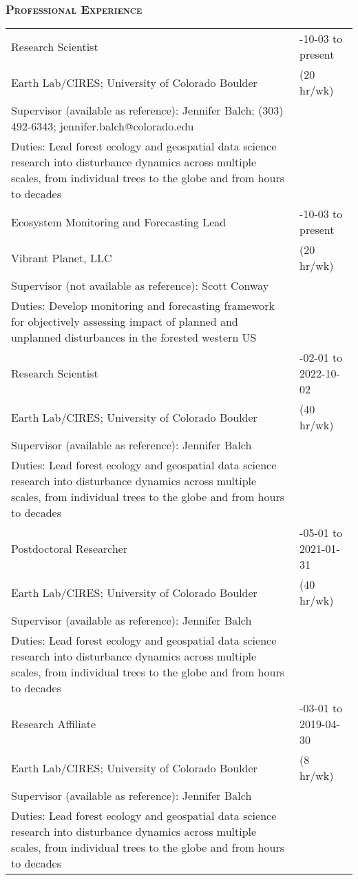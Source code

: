 \documentclass[10pt,english]{article}
\providecommand{\tabularnewline}{\\}
\begin{document}
\subsubsection*{\textsc{Professional Experience}}
\vspace{-0.5ex}

\renewcommand{\arraystretch}{1.2}
\begin{tabularx}{\textwidth}{@{}>{\raggedright}p{4.5in} >{\raggedleft}X@{}}

Research Scientist & 2022-10-03 to present \tabularnewline
\addtolength{\leftskip}{5ex}Earth Lab/CIRES; University of Colorado Boulder & (20 hr/wk) \tabularnewline
\addtolength{\leftskip}{5ex}Supervisor (available as reference): Jennifer Balch; (303) 492-6343; jennifer.balch@colorado.edu & \tabularnewline
\addtolength{\leftskip}{5ex}Duties: Lead forest ecology and geospatial data science research into disturbance dynamics across multiple scales, from individual trees to the globe and from hours to decades  & \tabularnewline

Ecosystem Monitoring and Forecasting Lead & 2022-10-03 to present \tabularnewline
\addtolength{\leftskip}{5ex}Vibrant Planet, LLC & (20 hr/wk) \tabularnewline
\addtolength{\leftskip}{5ex}Supervisor (not available as reference): Scott Conway & \tabularnewline
\addtolength{\leftskip}{5ex}Duties: Develop monitoring and forecasting framework for objectively assessing impact of planned and unplanned disturbances in the forested western US & \tabularnewline

Research Scientist & 2021-02-01 to 2022-10-02 \tabularnewline
\addtolength{\leftskip}{5ex}Earth Lab/CIRES; University of Colorado Boulder & (40 hr/wk) \tabularnewline
\addtolength{\leftskip}{5ex}Supervisor (available as reference): Jennifer Balch & \tabularnewline
\addtolength{\leftskip}{5ex}Duties: Lead forest ecology and geospatial data science research into disturbance dynamics across multiple scales, from individual trees to the globe and from hours to decades  & \tabularnewline

Postdoctoral Researcher & 2019-05-01 to 2021-01-31 \tabularnewline
\addtolength{\leftskip}{5ex}Earth Lab/CIRES; University of Colorado Boulder & (40 hr/wk) \tabularnewline
\addtolength{\leftskip}{5ex}Supervisor (available as reference): Jennifer Balch & \tabularnewline
\addtolength{\leftskip}{5ex}Duties: Lead forest ecology and geospatial data science research into disturbance dynamics across multiple scales, from individual trees to the globe and from hours to decades  & \tabularnewline

Research Affiliate & 2019-03-01 to 2019-04-30 \tabularnewline
\addtolength{\leftskip}{5ex}Earth Lab/CIRES; University of Colorado Boulder & (8 hr/wk) \tabularnewline
\addtolength{\leftskip}{5ex}Supervisor (available as reference): Jennifer Balch & \tabularnewline
\addtolength{\leftskip}{5ex}Duties: Lead forest ecology and geospatial data science research into disturbance dynamics across multiple scales, from individual trees to the globe and from hours to decades  & \tabularnewline

\end{tabularx}
\end{document}
